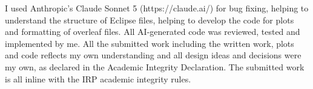 I used Anthropic's Claude Sonnet 5 (https://claude.ai/) for bug fixing, helping to understand the structure of Eclipse files, helping to develop the code for plots and formatting of overleaf files. All AI-generated code was reviewed, tested and implemented by me. All the submitted work including the written work, plots and code reflects my own understanding and all design ideas and decisions were my own, as declared in the Academic Integrity Declaration. The submitted work is all inline with the IRP academic integrity rules. 